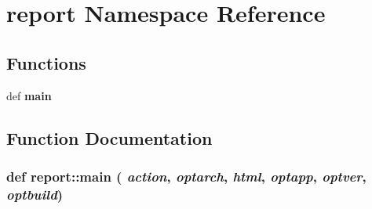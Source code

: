 \section{report Namespace Reference}
\label{namespacereport}


\subsection*{Functions}
\begin{CompactItemize}
\item 
def {\bf main}
\end{CompactItemize}


\subsection{Function Documentation}
\subsubsection{\setlength{\rightskip}{0pt plus 5cm}def report::main ( {\em action},  {\em optarch},  {\em html},  {\em optapp},  {\em optver},  {\em optbuild})}\label{namespacereport_d02d7ccb82cc19f4db7b72b12e98697e}


